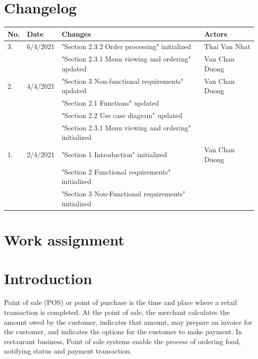 \documentclass[a4paper,11pt]{extarticle}
\begin{document}

\newpage
\tableofcontents
\newpage

\section*{Changelog}
\begin{tabularx}{\textwidth}{|l|l|X|l|}
\hline
\textbf{No.} & \textbf{Date} & \textbf{Changes} & \textbf{Actors} \\
\hline
3. & 6/4/2021 & "Section 2.3.2 Order processing" initialized & Thai Van Nhat \\
\hline
& & "Section 2.3.1 Menu viewing and ordering" updated & Van Chan Duong\\
\hline
2. & 4/4/2021 & "Section 3 Non-functional requirements" updated & Van Chan Duong \\
& & "Section 2.1 Functions" updated & \\
& & "Section 2.2 Use case diagram" updated & \\
& & "Section 2.3.1 Menu viewing and ordering" initialized & \\

\hline
1. & 2/4/2021 & "Section 1 Introduction" initialized & Van Chan Duong \\
& & "Section 2 Functional requirements" initialized & \\
& & "Section 3 Non-Functional requirements" initialized & \\
\hline

\end{tabularx}

\section*{Work assignment}

\newpage
\section{Introduction}
Point of sale (POS) or point of purchase is the time and place where a retail transaction is completed. At the point of sale, the merchant calculates the amount owed by the customer, indicates that amount, may prepare an invoice for the customer, and indicates the options for the customer to make payment. In restaurant business, Point of sale systems enable the process of ordering food, notifying status and payment transaction.
\newpage
\end{document}
